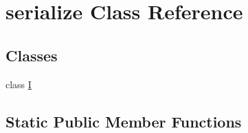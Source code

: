 \hypertarget{classserialize}{}\section{serialize Class Reference}
\label{classserialize}
\subsection*{Classes}
\begin{DoxyCompactItemize}
\item 
class \hyperlink{classserialize_1_1_i}{I}
\end{DoxyCompactItemize}
\subsection*{Static Public Member Functions}
